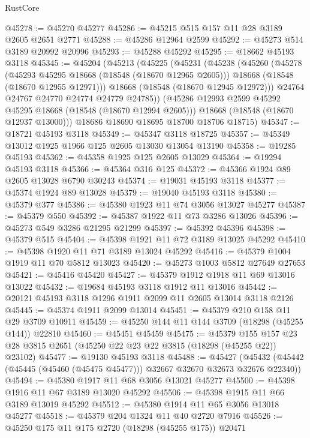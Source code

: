 \begin{lexlean}{RustCore}
\begin{coremodule}
@45278 := @45270 @45277
@45286 := @45215 @515 @157 @11 @28 @3189 @2605 @2651 @2771
@45288 := @45286 @12964 @2599
@45292 := @45273 @514 @3189 @20992 @20996
@45293 := @45288 @45292
@45295 := @18662 @45193 @3118
@45345 := @45204
    (@45213
      (@45225
        (@45231
          (@45238
            (@45260
              (@45278
                (@45293 @45295 @18668 (@18548 (@18670 @12965 @2605)))
                @18668
                (@18548 (@18670 @12955 @12971)))
              @18668
              (@18548 (@18670 @12945 @12972)))
            @24764
            @24767
            @24770
            @24774
            @24779
            @24785))
        (@45286 @12993 @2599 @45292 @45295 @18668 (@18548 (@18670 @12994 @2605)))
        @18668
        (@18548 (@18670 @12937 @13000)))
      @18686
      @18690
      @18695
      @18700
      @18706
      @18715)
@45347 := @18721 @45193 @3118
@45349 := @45347 @3118 @18725
@45357 := @45349 @13012 @1925 @1966 @125 @2605 @13030 @13054 @13190
@45358 := @19285 @45193
@45362 := @45358 @1925 @125 @2605 @13029
@45364 := @19294 @45193 @3118
@45366 := @45364 @316 @125
@45372 := @45366 @1924 @89 @2605 @13028 @6790 @30243
@45374 := @19031 @45193 @3118
@45377 := @45374 @1924 @89 @13028
@45379 := @19040 @45193 @3118
@45380 := @45379 @377
@45386 := @45380 @1923 @11 @74 @3056 @13027 @45277
@45387 := @45379 @550
@45392 := @45387 @1922 @11 @73 @3286 @13026
@45396 := @45273 @549 @3286 @21295 @21299
@45397 := @45392 @45396
@45398 := @45379 @515
@45404 := @45398 @1921 @11 @72 @3189 @13025 @45292
@45410 := @45398 @1920 @11 @71 @3189 @13024 @45292
@45416 := @45379 @1004 @1919 @11 @70 @5812 @13023
@45420 := @45273 @1003 @5812 @27649 @27653
@45421 := @45416 @45420
@45427 := @45379 @1912 @1918 @11 @69 @13016 @13022
@45432 := @19684 @45193 @3118 @1912 @11 @13016
@45442 := @20121 @45193 @3118 @1296 @1911 @2099 @11 @2605 @13014 @3118 @2126
@45445 := @45374 @1911 @2099 @13014
@45451 := @45379 @210 @158 @11 @29 @3709 @10911
@45459 := @45250 @144 @11 @144 @3709 (@18298 (@45255 @144)) @22810
@45460 := @45451 @45459
@45475 := @45379
    @155
    @157
    @23
    @28
    @3815
    @2651
    (@45250 @22 @23 @22 @3815 (@18298 (@45255 @22)) @23102)
@45477 := @19130 @45193 @3118
@45488 := @45427
    (@45432 (@45442 (@45445 (@45460 (@45475 @45477))) @32667 @32670 @32673 @32676 @22340))
@45494 := @45380 @1917 @11 @68 @3056 @13021 @45277
@45500 := @45398 @1916 @11 @67 @3189 @13020 @45292
@45506 := @45398 @1915 @11 @66 @3189 @13019 @45292
@45512 := @45380 @1914 @11 @65 @3056 @13018 @45277
@45518 := @45379 @204 @1324 @11 @40 @2720 @7916
@45526 := @45250 @175 @11 @175 @2720 (@18298 (@45255 @175)) @20471

\end{coremodule}
\end{lexlean}
